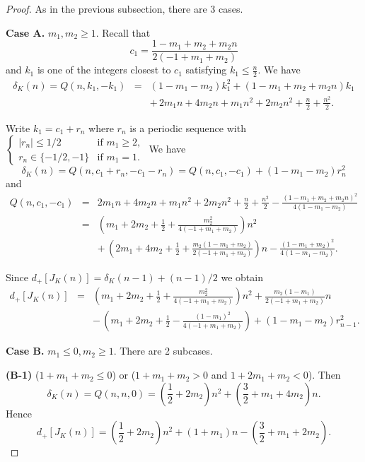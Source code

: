 \documentclass[11pt]{amsart}
\theoremstyle{definition}
\begin{document}
\begin{proof} As in the previous subsection, there are 3 cases.

\medskip

\textbf{Case A.} $m_1, m_2 \ge 1$. Recall that $$c_1=\frac{1 - m_1 + m_2 + m_2 n}{2 (-1 + m_1 + m_2)}$$ 
and $k_1$ is one of the integers closest to $c_1$ satisfying $k_1 \le \frac{n}{2}$. We have
\begin{eqnarray*}
\delta_K(n) = Q(n,k_1,-k_1)
&=& (1-m_1-m_2) k_1^2 + ( 1 - m_1 + m_2 + m_2 n) k_1 \\
&& + \, 2 m_1 n + 4 m_2 n  + m_1 n^2 + 2 m_2 n^2 + \frac{n}{2} + \frac{n^2}{2}.
\end{eqnarray*}

Write $k_1 = c_1 + r_n$ where $r_n$ is a periodic sequence with $\begin{cases} |r_n| \le 1/2 &\mbox{if } m_1 \ge 2, 
\\ r_n \in \{-1/2, -1\}  & \mbox{if } m_1 = 1. 
\end{cases}$ We have
$$
\delta_K(n) = Q(n,c_1+r_n,-c_1-r_n) = Q(n,c_1,-c_1) + (1-m_1-m_2) r_n^2
$$
and
\begin{eqnarray*}
Q(n,c_1,-c_1) &=& 2 m_1 n + 4 m_2 n  + m_1 n^2 + 2 m_2 n^2 + \frac{n}{2} + \frac{n^2}{2} -\frac{( 1 - m_1 + m_2 + m_2 n)^2}{4(1-m_1-m_2)} \\
&=& \left( m_1 + 2m_2 + \frac{1}{2} + \frac{m_2^2}{4(-1 + m_1 + m_2)} \right) n^2 \\
&& + \,  \left( 2m_1 + 4m_2 + \frac{1}{2} + \frac{m_2(1-m_1+m_2)}{2(-1 + m_1 + m_2)} \right) n - \frac{( 1 - m_1 + m_2)^2}{4(1-m_1-m_2)}.
\end{eqnarray*} 

Since $d_+[J_K(n)] = \delta_K(n-1) + (n-1)/2$ we obtain
\begin{eqnarray*}
d_+[J_K(n)] &=& \left( m_1 + 2m_2 + \frac{1}{2} + \frac{m_2^2}{4(-1 + m_1 + m_2)} \right) n^2 + \frac{m_2(1-m_1)}{2(-1+m_1+m_2)} n\\
&& - \, \left( m_1 + 2m_2 + \frac{1}{2} - \frac{(1-m_1)^2}{4(-1 + m_1 + m_2)} \right) + (1-m_1-m_2) r^2_{n-1}.
\end{eqnarray*} 
\medskip

\textbf{Case B.} $m_1 \le 0, m_2 \ge 1$.  There are 2 subcases.

\textbf{(B-1)} ($1 + m_1 + m_2 \le 0$) or ($1 + m_1 + m_2 > 0$ and $1 + 2m_1 + m_2 < 0$). Then
$$\delta_K(n) = Q(n,n,0)=\left( \frac{1}{2} + 2 m_2 \right) n^2 + \left( \frac{3}{2} + m_1 + 4 m_2 \right) n.$$
Hence $$
d_+[J_K(n)] = \left( \frac{1}{2} + 2 m_2 \right) n^2 + (1 + m_1) n - \left( \frac{3}{2} + m_1 + 2 m_2 \right).
$$


\end{proof}
\end{document}
